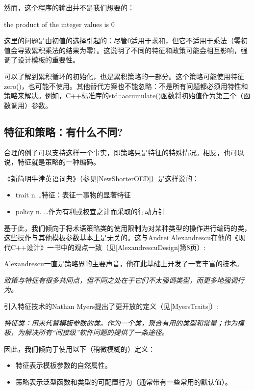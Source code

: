 然而，这个程序的输出并不是我们想要的：

\begin{shell}
the product of the integer values is 0
\end{shell}

这里的问题是由初值的选择引起的：尽管0适用于求和，但它不适用于乘法（零初值会导致累积乘法的结果为零）。这说明了不同的特征和政策可能会相互影响，强调了设计模板的重要性。

可以了解到累积循环的初始化，也是累积策略的一部分。这个策略可能使用特征zero()，也可能不使用。其他替代方案也不能忽略：不是所有问题都必须用特性和策略来解决。例如，C++标准库的std::accumulate()函数将初始值作为第三个（函数调用）参数。

\subsection{特征和策略：有什么不同?}

合理的例子可以支持这样一个事实，即策略只是特征的特殊情况。相反，也可以说，特征就是策略的一种编码。

《新简明牛津英语词典》（参见[NewShorterOED]）是这样说的：

\begin{itemize}
\item 
trait n.…特征：表征一事物的显著特征

\item 
policy n. …作为有利或权宜之计而采取的行动方针
\end{itemize}

基于此，我们倾向于将术语策略类的使用限制为对某种类型的操作进行编码的类，这些操作与其他模板参数基本上是无关的。这与Andrei Alexandrescu在他的《现代C++设计》一书中的观点一致（见[AlexandrescuDesign]第8页）:

\begin{notice}
Alexandrescu一直是策略界的主要声音，他在此基础上开发了一套丰富的技术。
\end{notice}

\textit{政策与特征有很多共同点，但不同之处在于它们不太强调类型，而更多地强调行为。}

引入特征技术的Nathan Myers提出了更开放的定义（见[MyersTraits]）:

\textit{特征类：用来代替模板参数的类。作为一个类，聚合有用的类型和常量；作为模板，为解决所有“间接级”软件问题的提供了一条途径。}

因此，我们倾向于使用以下（稍微模糊的）定义：

\begin{itemize}
\item 
特征表示模板参数的自然属性。

\item 
策略表示泛型函数和类型的可配置行为（通常带有一些常用的默认值）。
\end{itemize}

